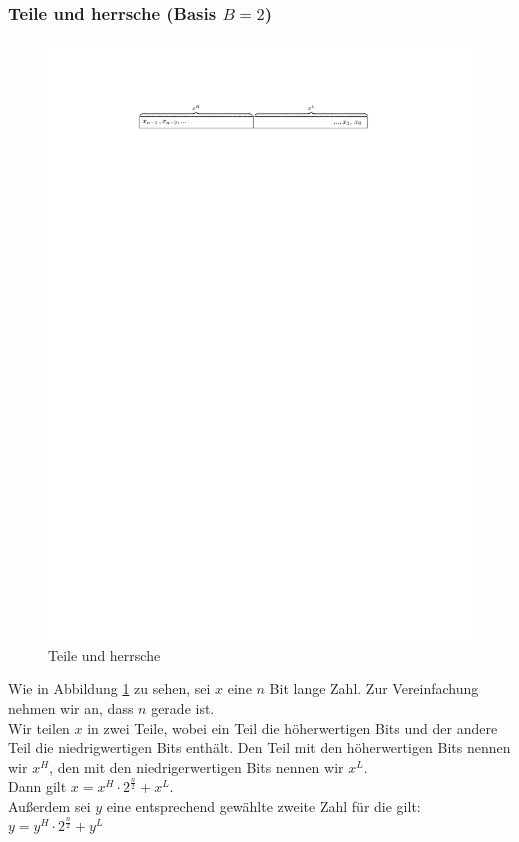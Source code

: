 \subsubsection*{Teile und herrsche (Basis $B=2$)}
\begin{figure}[h!]
    \begin{center}
        \includegraphics[width=\textwidth]{../GFX/VL4-hi-lo.pdf}
    \caption{Teile und herrsche}
    \label{fig:DaC}
    \end{center}
\end{figure}
Wie in Abbildung \ref{fig:DaC} zu sehen, sei $x$ eine $n$ Bit lange Zahl. Zur Vereinfachung nehmen wir an, dass $n$ gerade ist.\\
Wir teilen $x$ in zwei Teile, wobei ein Teil die höherwertigen Bits und der andere Teil die niedrigwertigen Bits enthält. Den Teil mit den höherwertigen Bits nennen wir $x^H$, den mit den niedrigerwertigen Bits nennen wir $x^L$.\\
Dann gilt $x= x^H\cdot 2^{\frac{n}{2}}+x^L$.\\
Außerdem sei $y$ eine entsprechend gewählte zweite Zahl für die gilt:\\
$y= y^H\cdot 2^{\frac{n}{2}}+y^L$\\



